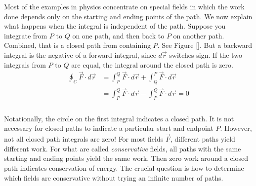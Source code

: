 Most of the examples in physics concentrate on special fields in which the work done depends only on the starting and ending points of the path. We now explain what happens when the integral is independent of the path. Suppose you integrate from $P$ to $Q$ on one path, and then back to $P$ on another path. Combined, that is a closed path from containing $P$. See Figure \ref{}. But a backward integral is the negative of a forward integral, since $d\vec r$ switches sign. If the two integrals from $P$ to $Q$ are equal, the integral around the closed path is zero.
\begin{align*}
\oint_C \vec F \cdot d\vec r & = \int_P^Q \vec F \cdot d\vec r + \int_Q^P \vec F \cdot d\vec r \\
 & = \int_P^Q\vec F \cdot d\vec r - \int_P^Q\vec F \cdot d\vec r = 0 \\
\end{align*}\\

Notationally, the circle on the first integral indicates a closed path. It is not necessary for closed paths to indicate a particular start and endpoint $P$. However, not all closed path integrals are zero! For most fields $\vec F$, different paths yield
different work. For what are called \emph{conservative} fields, all paths with the same starting and ending points yield the same work. Then zero work around a closed path indicates conservation of energy. The crucial question is how to determine which fields are conservative without trying an infinite number of paths.\\

\\

